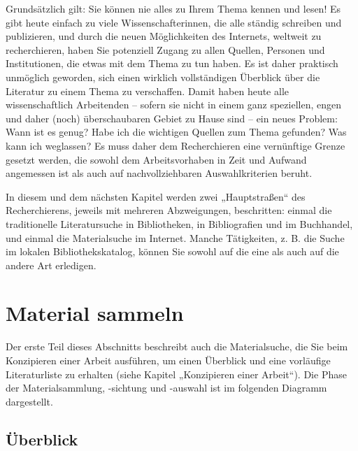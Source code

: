 \documentclass[]{book}
\theoremstyle{definition}
\theoremstyle{definition}
\theoremstyle{definition}
\theoremstyle{remark}
\begin{document}
Grundsätzlich gilt: Sie können nie alles zu Ihrem Thema kennen und
lesen! Es gibt heute einfach zu viele Wissenschafterinnen, die alle
ständig schreiben und publizieren, und durch die neuen Möglichkeiten des
Internets, weltweit zu recherchieren, haben Sie potenziell Zugang zu
allen Quellen, Personen und Institutionen, die etwas mit dem Thema zu
tun haben. Es ist daher praktisch unmöglich geworden, sich einen
wirklich vollständigen Überblick über die Literatur zu einem Thema zu
verschaffen. Damit haben heute alle wissenschaftlich Arbeitenden --
sofern sie nicht in einem ganz speziellen, engen und daher (noch)
überschaubaren Gebiet zu Hause sind -- ein neues Problem: Wann ist es
genug? Habe ich die wichtigen Quellen zum Thema gefunden? Was kann ich
weglassen? Es muss daher dem Recherchieren eine vernünftige Grenze
gesetzt werden, die sowohl dem Arbeitsvorhaben in Zeit und Aufwand
angemessen ist als auch auf nachvollziehbaren Auswahlkriterien beruht.

In diesem und dem nächsten Kapitel werden zwei „Hauptstraßen`` des
Recherchierens, jeweils mit mehreren Abzweigungen, beschritten: einmal
die traditionelle Literatursuche in Bibliotheken, in Bibliografien und
im Buchhandel, und einmal die Materialsuche im Internet. Manche
Tätigkeiten, z. B. die Suche im lokalen Bibliothekskatalog, können Sie
sowohl auf die eine als auch auf die andere Art erledigen.

\section{Material sammeln}\label{recherchieren-material-sammeln}

Der erste Teil dieses Abschnitts beschreibt auch die Materialsuche, die
Sie beim Konzipieren einer Arbeit ausführen, um einen Überblick und eine
vorläufige Literaturliste zu erhalten (siehe Kapitel „Konzipieren einer
Arbeit``). Die Phase der Materialsammlung, -sichtung und -auswahl ist im
folgenden Diagramm dargestellt.

\subsection{Überblick}\label{uberblick}
\end{document}
